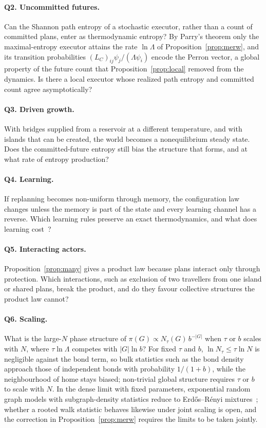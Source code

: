 \documentclass[aps,pre,preprint,superscriptaddress,nofootinbib]{revtex4-2}
\theoremstyle{definition}
\theoremstyle{remark}
\newcommand{\N}{N_\tau}
\begin{document}
\paragraph*{Q2. Uncommitted futures.} Can the Shannon path entropy of a stochastic executor, rather than a count of committed plans, enter as thermodynamic entropy? By Parry's theorem only the maximal-entropy executor attains the rate $\ln\Lambda$ of Proposition~\ref{prop:merw}, and its transition probabilities $(L_C)_{ij}\psi_j/(\Lambda\psi_i)$ encode the Perron vector, a global property of the future count that Proposition~\ref{prop:local} removed from the dynamics. Is there a local executor whose realized path entropy and committed count agree asymptotically?

\paragraph*{Q3. Driven growth.} With bridges supplied from a reservoir at a different temperature, and with islands that can be created, the world becomes a nonequilibrium steady state. Does the committed-future entropy still bias the structure that forms, and at what rate of entropy production?

\paragraph*{Q4. Learning.} If replanning becomes non-uniform through memory, the configuration law changes unless the memory is part of the state and every learning channel has a reverse. Which learning rules preserve an exact thermodynamics, and what does learning cost~\cite{GoldtSeifert2017}?

\paragraph*{Q5. Interacting actors.} Proposition~\ref{prop:many} gives a product law because plans interact only through protection. Which interactions, such as exclusion of two travellers from one island or shared plans, break the product, and do they favour collective structures the product law cannot?

\paragraph*{Q6. Scaling.} What is the large-$N$ phase structure of $\pi(G)\propto\N(G)\,b^{-|G|}$ when $\tau$ or $b$ scales with $N$, where $\tau\ln\Lambda$ competes with $|G|\ln b$? For fixed $\tau$ and $b$, $\ln\N\le\tau\ln N$ is negligible against the bond term, so bulk statistics such as the bond density approach those of independent bonds with probability $1/(1+b)$, while the neighbourhood of home stays biased; non-trivial global structure requires $\tau$ or $b$ to scale with $N$. In the dense limit with fixed parameters, exponential random graph models with subgraph-density statistics reduce to Erd\H{o}s--R\'enyi mixtures~\cite{ChatterjeeDiaconis2013}; whether a rooted walk statistic behaves likewise under joint scaling is open, and the correction in Proposition~\ref{prop:merw} requires the limits to be taken jointly.
\end{document}
